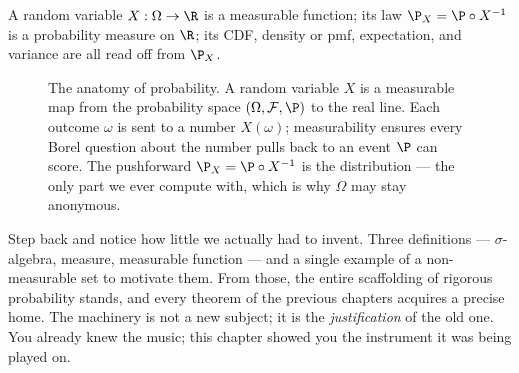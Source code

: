 A random variable $X : \Omega \to \R$ is a measurable function; its law
$\P_X = \P \circ X^{-1}$ is a probability measure on $\R$; its CDF, density or pmf,
expectation, and variance are all read off from $\P_X$.

\begin{figure}[H]
\centering
{}
\caption{The anatomy of probability. A random variable $X$ is a measurable map
from the probability space $(\Omega,\mathcal{F},\P)$ to the real line. Each outcome
$\omega$ is sent to a number $X(\omega)$; measurability ensures every Borel
question about the number pulls back to an event $\P$ can score. The pushforward
$\P_X = \P\circ X^{-1}$ is the distribution --- the only part we ever compute with,
which is why $\Omega$ may stay anonymous.}
\label{ch36:fig-anatomy}
\end{figure}

\begin{recoverybox}
Step back and notice how little we actually had to invent. Three definitions ---
$\sigma$-algebra, measure, measurable function --- and a single example of a
non-measurable set to motivate them. From those, the entire scaffolding of rigorous
probability stands, and every theorem of the previous chapters acquires a precise
home. The machinery is not a new subject; it is the \emph{justification} of the
old one. You already knew the music; this chapter showed you the instrument it was
being played on.
\end{recoverybox}

